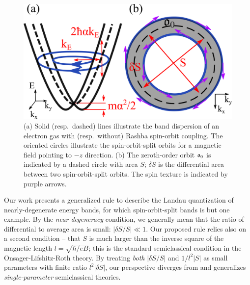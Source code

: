 \documentclass[aps, showpacs, twocolumn, notitlepage, superscriptaddress]{revtex4-1}
\begin{document}
\begin{figure}
\includegraphics[width=0.9\columnwidth]{orbits.png}
\caption{(a) Solid (resp.\ dashed) lines illustrate the band dispersion of an electron gas with (resp.\ without) Rashba spin-orbit coupling.  The oriented circles illustrate the spin-orbit-split orbits for a magnetic field pointing to $-z$ direction. (b) The zeroth-order orbit $\mathfrak{o}_0$ is indicated by a dashed circle with area $S$; $\delta S$ is the differential area  between two spin-orbit-split orbits. The spin texture is indicated by purple arrows.\label{fig:orbits}}
\end{figure}

Our work presents a generalized rule to describe the Landau quantization of nearly-degenerate energy bands, for which  spin-orbit-split bands is but one example. By the \textit{near-degeneracy} condition, we generally mean that
the ratio of differential to average area is small: $|\delta S/S|{\ll}1$. Our proposed rule relies also on a second condition -- that $S$ is much larger than the inverse square of the magnetic length $l{=}\sqrt{\hbar/eB}$; this is the standard semiclassical condition in the Onsager-Lifshitz-Roth theory. By treating \textit{both} $|\delta S/S|$ and $1/l^2|S|$   as small parameters with finite ratio $l^2|\delta S|$, our perspective diverges from and generalizes \textit{single-parameter} semiclassical theories\cite{kohn_effham,blount_effham,rotheffham,wannier_fredkin,fischbeck_review,Mikitik_quantizationrule,topoferm,100p,gao_zero-field_2017}.
\end{document}
